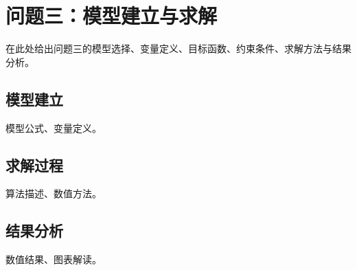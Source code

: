 \section{问题三：模型建立与求解}

在此处给出问题三的模型选择、变量定义、目标函数、约束条件、求解方法与结果分析。

\subsection{模型建立}

模型公式、变量定义。

\subsection{求解过程}

算法描述、数值方法。

\subsection{结果分析}

数值结果、图表解读。

